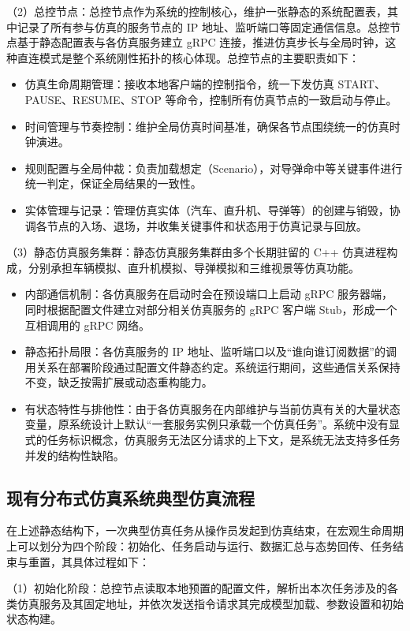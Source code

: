 \documentclass[lang=chs, degree=master, blindreview=true, winfonts=true, academic=false]{yanputhesis}
\begin{document}
（2）总控节点：总控节点作为系统的控制核心，维护一张静态的系统配置表，其中记录了所有参与仿真的服务节点的 IP 地址、监听端口等固定通信信息。总控节点基于静态配置表与各仿真服务建立 gRPC 连接，推进仿真步长与全局时钟，这种直连模式是整个系统刚性拓扑的核心体现。总控节点的主要职责如下：

\begin{itemize}
    \item 仿真生命周期管理：接收本地客户端的控制指令，统一下发仿真 START、PAUSE、RESUME、STOP 等命令，控制所有仿真节点的一致启动与停止。
    \item 时间管理与节奏控制：维护全局仿真时间基准，确保各节点围绕统一的仿真时钟演进。
    \item 规则配置与全局仲裁：负责加载想定（Scenario），对导弹命中等关键事件进行统一判定，保证全局结果的一致性。
    \item 实体管理与记录：管理仿真实体（汽车、直升机、导弹等）的创建与销毁，协调各节点的入场、退场，并收集关键事件和状态用于仿真记录与回放。
\end{itemize}

（3）静态仿真服务集群：静态仿真服务集群由多个长期驻留的 C++ 仿真进程构成，分别承担车辆模拟、直升机模拟、导弹模拟和三维视景等仿真功能。

\begin{itemize}
    \item 内部通信机制：各仿真服务在启动时会在预设端口上启动 gRPC 服务器端，同时根据配置文件建立对部分相关仿真服务的 gRPC 客户端 Stub，形成一个互相调用的 gRPC 网络。
    \item 静态拓扑局限：各仿真服务的 IP 地址、监听端口以及“谁向谁订阅数据”的调用关系在部署阶段通过配置文件静态约定。系统运行期间，这些通信关系保持不变，缺乏按需扩展或动态重构能力。
    \item 有状态特性与排他性：由于各仿真服务在内部维护与当前仿真有关的大量状态变量，原系统设计上默认“一套服务实例只承载一个仿真任务”。系统中没有显式的任务标识概念，仿真服务无法区分请求的上下文，是系统无法支持多任务并发的结构性缺陷。
\end{itemize}

\subsection{现有分布式仿真系统典型仿真流程}

在上述静态结构下，一次典型仿真任务从操作员发起到仿真结束，在宏观生命周期上可以划分为四个阶段：初始化、任务启动与运行、数据汇总与态势回传、任务结束与重置，其具体过程如下：

（1）初始化阶段：总控节点读取本地预置的配置文件，解析出本次任务涉及的各类仿真服务及其固定地址，并依次发送指令请求其完成模型加载、参数设置和初始状态构建。
\end{document}
